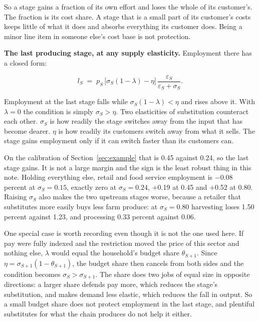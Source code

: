 \documentclass[11pt,a4paper]{article}
\begin{document}
So a stage gains a fraction of its own effort and loses the whole of its customer's. The fraction is its cost share. A stage that is a small part of its customer's costs keeps little of what it does and absorbs everything its customer does. Being a minor line item in someone else's cost base is not protection.

\textbf{The last producing stage, at any supply elasticity.} Employment there has a closed form:

\begin{equation}
l_S \;=\; p_S \,\big[\sigma_S (1-\lambda) - \eta\big] \, \frac{\varepsilon_S}{\varepsilon_S + \sigma_S} .
\label{eq:lastst}
\end{equation}

Employment at the last stage falls while $\sigma_S(1-\lambda) < \eta$ and rises above it. With $\lambda = 0$ the condition is simply $\sigma_S > \eta$. Two elasticities of substitution counteract each other. $\sigma_S$ is how readily the stage switches away from the input that has become dearer. $\eta$ is how readily its customers switch away from what it sells. The stage gains employment only if it can switch faster than its customers can.

On the calibration of Section~\ref{sec:example} that is 0.45 against 0.24, so the last stage gains. It is not a large margin and the sign is the least robust thing in this note. Holding everything else, retail and food service employment is $-$0.08 percent at $\sigma_S = 0.15$, exactly zero at $\sigma_S = 0.24$, $+$0.19 at 0.45 and $+$0.52 at 0.80. Raising $\sigma_S$ also makes the two upstream stages worse, because a retailer that substitutes more easily buys less farm produce: at $\sigma_S = 0.80$ harvesting loses 1.50 percent against 1.23, and processing 0.33 percent against 0.06.

One special case is worth recording even though it is not the one used here. If pay were fully indexed and the restriction moved the price of this sector and nothing else, $\lambda$ would equal the household's budget share $\theta_{S+1}$. Since $\eta = \sigma_{S+1}(1-\theta_{S+1})$, the budget share then cancels from both sides and the condition becomes $\sigma_S > \sigma_{S+1}$. The share does two jobs of equal size in opposite directions: a larger share defends pay more, which reduces the stage's substitution, and makes demand less elastic, which reduces the fall in output. So a small budget share does not protect employment in the last stage, and plentiful substitutes for what the chain produces do not help it either.
\end{document}
